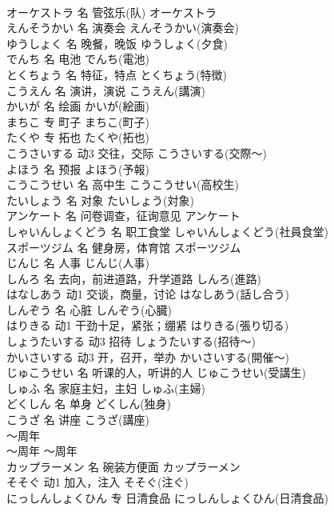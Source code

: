 \documentclass[8pt]{extreport}
\begin{document}
\begin{CJK}{UTF8}{min}
\\	オーケストラ	名	管弦乐(队)	オーケストラ	
\\	えんそうかい	名	演奏会	えんそうかい(演奏会)	
\\	ゆうしょく	名	晚餐，晚饭	ゆうしょく(夕食)	
\\	でんち	名	电池	でんち(電池)	
\\	とくちょう	名	特征，特点	とくちょう(特徴)	
\\	こうえん	名	演讲，演说	こうえん(講演)	
\\	かいが	名	绘画	かいが(絵画)	
\\	まちこ	专	町子	まちこ(町子)	
\\	たくや	专	拓也	たくや(拓也)	
\\	こうさいする	动3	交往，交际	こうさいする(交際～)	
\\	よほう	名	预报	よほう(予報)	
\\	こうこうせい	名	高中生	こうこうせい(高校生)	
\\	たいしょう	名	对象	たいしょう(対象)	
\\	アンケート	名	问卷调查，征询意见	アンケート	
\\	しゃいんしょくどう	名	职工食堂	しゃいんしょくどう(社員食堂)	
\\	スポーツジム	名	健身房，体育馆	スポーツジム	
\\	じんじ	名	人事	じんじ(人事)	
\\	しんろ	名	去向，前进道路，升学道路	しんろ(進路)	
\\	はなしあう	动1	交谈，商量，讨论	はなしあう(話し合う)	
\\	しんぞう	名	心脏	しんぞう(心臓)	
\\	はりきる	动1	干劲十足，紧张；绷紧	はりきる(張り切る)	
\\	しょうたいする	动3	招待	しょうたいする(招待～)	
\\	かいさいする	动3	开，召开，举办	かいさいする(開催～)	
\\	じゅこうせい	名	听课的人，听讲的人	じゅこうせい(受講生)	
\\	しゅふ	名	家庭主妇，主妇	しゅふ(主婦)	
\\	どくしん	名	单身	どくしん(独身)	
\\	こうざ	名	讲座	こうざ(講座)	
\\	～周年	
\\	～周年	～周年	
\\	カップラーメン	名	碗装方便面	カップラーメン	
\\	そそぐ	动1	加入，注入	そそぐ(注ぐ)	
\\	にっしんしょくひん	专	日清食品	にっしんしょくひん(日清食品)	

\end{CJK}
\end{document}
